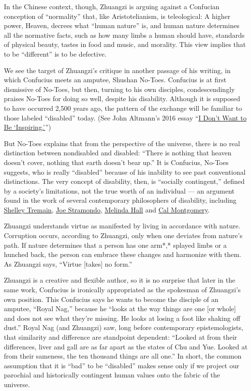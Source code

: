 In the Chinese context, though, Zhuangzi is arguing against a Confucian
conception of ``normality'' that, like Aristotelianism, is teleological:
A higher power, Heaven, decrees what ``human nature'' is, and human
nature determines all the normative facts, such as how many limbs a
human should have, standards of physical beauty, tastes in food and
music, and morality. This view implies that to be ``different'' is to be
defective.

We see the target of Zhuangzi's critique in another passage of his
writing, in which Confucius meets an amputee, Shushan No-Toes. Confucius
is at first dismissive of No-Toes, but then, turning to his own
disciples, condescendingly praises No-Toes for doing so well, despite
his disability. Although it is supposed to have occurred 2,500 years
ago, the pattern of the exchange will be familiar to those labeled
``disabled'' today. (See John Altmann's 2016 essay
``\href{https://www.nytimes.com/2016/10/20/opinion/i-dont-want-to-be-inspiring.html}{I
Don't Want to Be `Inspiring.'}'')

But No-Toes explains that from the perspective of the universe, there is
no real distinction between nondisabled and disabled: ``There is nothing
that heaven doesn't cover, nothing that earth doesn't bear up.'' It is
Confucius, No-Toes suggests, who is really ``disabled'' because of his
inability to see past conventional distinctions. The very concept of
disability, then, is ``socially contingent,'' defined by a society's
limitations, not the true worth of an individual --- an argument found
in the work of several contemporary philosophers of disability,
including \href{https://biopoliticalphilosophy.com/}{Shelley Tremain},
\href{http://www.bioethics.net/2020/03/covid-19-triage-and-disability-what-not-to-do/}{Joe
Stramondo},
\href{https://plato.stanford.edu/entries/disability-critical/}{Melinda
Hall} and \href{http://www.raggededgemagazine.com/0501/0501cov.htm}{Cal
Montgomery}.

Zhuangzi understands virtue as manifested by living in accordance with
nature. Corruption occurs, according to Zhuangzi, only when one deviates
from nature's path. If nature determines that a person has one arm*,*
splayed limbs or a hunched back, the person can embrace these changes
and harmonize with them. As Zhuangzi says, ``Virtue {[}takes{]} no
form.''

Zhuangzi is a creative and flexible author, so it is no surprise that
later in the same work, Confucius is ironically appropriated as the
spokesman of Zhuangzi's own position. This Confucius says he wants to
become the disciple of an amputee, ``Royal Nag,'' because he ``looks at
the way things are one {[}or whole{]} and does not see what they're
missing. He looks at losing a foot like shaking off dust.'' Royal Nag
(and Zhuangzi) saw, long before contemporary epistemologists, that
similarity and difference are standpoint dependent: ``Looked at from
their differences, liver and gall are as far apart as the states of Chu
and Yue. Looked at from their sameness, the ten thousand things are all
one.'' In short, the common assumption that it is ``bad'' to be
``disabled'' makes sense only if we project our parochial and
historically contingent human values onto the fabric of the universe.

